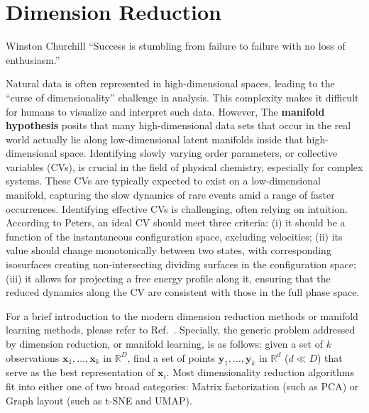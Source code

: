 \chapter{Dimension Reduction\label{chapter:DR}}
\begin{chapquote}{Winston Churchill%
	}
	``Success is stumbling from failure to failure with no loss of enthusiasm.''
\end{chapquote}

Natural data is often represented in high-dimensional spaces, leading to the ``curse of dimensionality'' challenge in analysis. This complexity makes it difficult for humans to visualize and interpret such data. However, The \textbf{manifold hypothesis} posits that many high-dimensional data sets that occur in the real world actually lie along low-dimensional latent manifolds inside that high-dimensional space. Identifying slowly varying order parameters, or collective variables (CVs), is crucial in the field of physical chemistry, especially for complex systems. These CVs are typically expected to exist on a low-dimensional manifold, capturing the slow dynamics of rare events amid a range of faster occurrences. Identifying effective CVs is challenging, often relying on intuition. According to Peters\cite{PetersARPC2016}, an ideal CV should meet three criteria: (i) it should be a function of the instantaneous configuration space, excluding velocities; (ii) its value should change monotonically between two states, with corresponding isosurfaces creating non-intersecting dividing surfaces in the configuration space; (iii) it allows for projecting a free energy profile along it, ensuring that the reduced dynamics along the CV are consistent with those in the full phase space.

For a brief introduction to the modern dimension reduction methods or manifold learning methods, please refer to Ref.~\cite{IzamanWIREsCS2012}. Specially, the generic problem addressed by dimension reduction, or manifold learning, is as follows: given a set of $k$ observations $\mathbf{x}_1,\dots,\mathbf{x}_k$ in $\mathbb{R}^D$, find a set of points $\mathbf{y}_1,\dots,\mathbf{y}_k$ in $\mathbb{R}^d$ ($d\ll D$) that serve as the best representation of $\mathbf{x}_i$. Most dimensionality reduction algorithms fit into either one of two broad categories: Matrix factorization (such as PCA) or Graph layout (such as t-SNE and UMAP).

